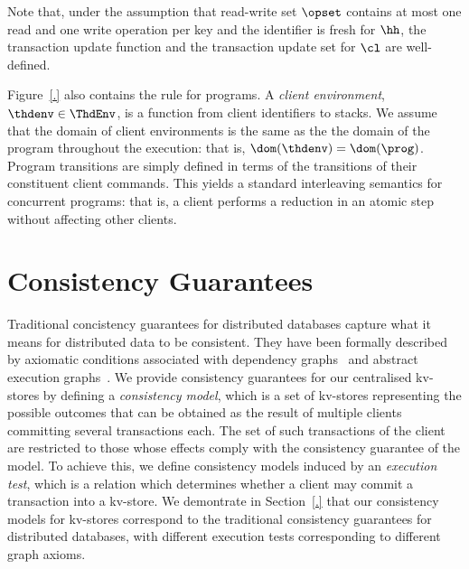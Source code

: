 Note that,  under the assumption that read-write set  $\opset$ contains at most one read and one write 
operation per key and the identifier is fresh for $\hh$, 
the transaction update function and the transaction update set for
$\cl$ are well-defined. 



Figure~\ref{.} also contains the rule for programs. 
A \emph{client environment}, $\thdenv \in \ThdEnv$, is a function  from client identifiers to stacks. 
We assume that the domain of client environments  is the same as the
the domain of the program throughout the execution: 
that is,
$\dom(\thdenv) = \dom(\prog)$.
Program transitions are simply defined in terms of the transitions of
their constituent client commands. 
This  yields a  standard interleaving semantics for concurrent
programs:
that is, 
a client performs a reduction in an atomic step without
affecting other clients. 








\section{Consistency Guarantees}

Traditional concistency guarantees for distributed databases capture
what it means for distributed data to be consistent. They have been
formally described by axiomatic conditions associated with 
 dependency graphs~\cite{.} and abstract
execution graphs~\cite{.}. We provide consistency guarantees for our
centralised kv-stores by defining a {\em consistency model}, which is
a set of kv-stores representing the possible outcomes that can be
obtained as the result of multiple clients committing several
transactions each.  The set of such transactions of the client are  restricted
to those whose effects comply with the consistency guarantee of the model. To
achieve this, we define consistency models induced by an {\em
  execution test}, which is a relation which determines whether a
client may commit a transaction into a kv-store.  We demontrate in
Section~\ref{.} that our consistency models for kv-stores correspond
to the traditional consistency guarantees for distributed databases,
with different execution tests corresponding to different graph
axioms.




